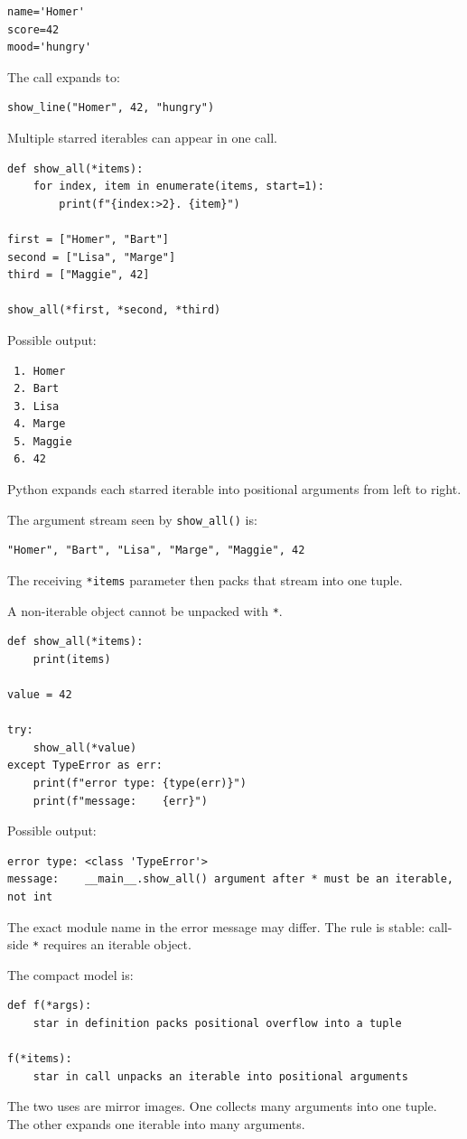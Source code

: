 \begin{verbatim}
name='Homer'
score=42
mood='hungry'
\end{verbatim}

The call expands to:

\begin{verbatim}
show_line("Homer", 42, "hungry")
\end{verbatim}

Multiple starred iterables can appear in one call.

\begin{verbatim}
def show_all(*items):
    for index, item in enumerate(items, start=1):
        print(f"{index:>2}. {item}")

first = ["Homer", "Bart"]
second = ["Lisa", "Marge"]
third = ["Maggie", 42]

show_all(*first, *second, *third)
\end{verbatim}

Possible output:

\begin{verbatim}
 1. Homer
 2. Bart
 3. Lisa
 4. Marge
 5. Maggie
 6. 42
\end{verbatim}

Python expands each starred iterable into positional arguments from left to right.

The argument stream seen by \texttt{show\_all()} is:

\begin{verbatim}
"Homer", "Bart", "Lisa", "Marge", "Maggie", 42
\end{verbatim}

The receiving \texttt{*items} parameter then packs that stream into one tuple.

A non-iterable object cannot be unpacked with \texttt{*}.

\begin{verbatim}
def show_all(*items):
    print(items)

value = 42

try:
    show_all(*value)
except TypeError as err:
    print(f"error type: {type(err)}")
    print(f"message:    {err}")
\end{verbatim}

Possible output:

\begin{verbatim}
error type: <class 'TypeError'>
message:    __main__.show_all() argument after * must be an iterable, not int
\end{verbatim}

The exact module name in the error message may differ. The rule is stable: call-side \texttt{*} requires an iterable object.

The compact model is:

\begin{verbatim}
def f(*args):
    star in definition packs positional overflow into a tuple

f(*items):
    star in call unpacks an iterable into positional arguments
\end{verbatim}

The two uses are mirror images. One collects many arguments into one tuple. The other expands one iterable into many arguments.